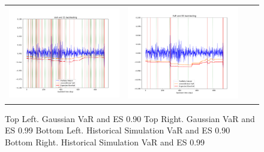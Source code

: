 \documentclass[a4paper,11pt]{article}
\begin{document}
\begin{flushleft}
\begin{itemize}
\begin{figure}[H]
{\begin{tabular}{@{}cccc@{}}
    \includegraphics[scale=0.3]{HS_090_VaR_ES.png} &
    \includegraphics[scale=0.3]{HS_099_VaR_ES.png}   \\
  \end{tabular}}
  \caption{Top Left. Gaussian VaR and ES 0.90 Top Right. Gaussian VaR and ES 0.99 Bottom Left. Historical Simulation VaR and ES 0.90 Bottom Right.  Historical Simulation VaR and ES 0.99}
\end{figure}

\end{itemize}
\end{flushleft}
\end{document}
